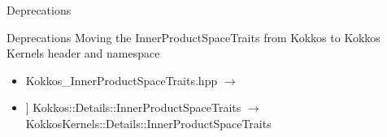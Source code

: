 \begin{frame}[fragile]

  {\Huge Deprecations}

  \vspace{10pt}

\end{frame}

\begin{frame}[fragile]{Deprecations}
  Moving the InnerProductSpaceTraits from Kokkos to Kokkos Kernels header and namespace
  \begin{itemize}
  \item {\ttfamily Kokkos\_InnerProductSpaceTraits.hpp} $\rightarrow$ \\
    \hspace{1cm}{\ttfamily KokkosKernels\_InnerProductSpaceTraits.hpp}
  \item {\ttfamily [[deprecated("...")]] Kokkos::Details::InnerProductSpaceTraits} $\rightarrow$\\
    {\ttfamily KokkosKernels::Details::InnerProductSpaceTraits}
  \end{itemize}
\end{frame}
